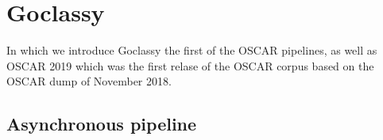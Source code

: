 \chapter{Goclassy}

\begin{center}
    \begin{minipage}{0.5\textwidth}
        \begin{small}
            In which we introduce Goclassy the first of the OSCAR pipelines, as well as OSCAR 2019 which was the first relase of the OSCAR corpus based on the OSCAR dump of November 2018.
        \end{small}
    \end{minipage}
    \vspace{0.5cm}
\end{center}


\section{Asynchronous pipeline}

